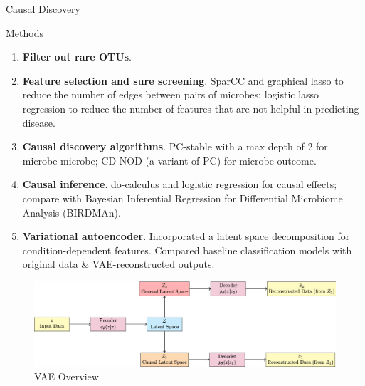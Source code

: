 \documentclass[final]{beamer}
\newlength{\colwidth}
\begin{document}
\begin{frame}[t]
\begin{columns}[t]
\begin{column}{\colwidth}
\begin{alertblock}{Causal Discovery}
	\end{alertblock}
	  
	  
\begin{block}{Methods}


    \begin{enumerate}
      \item \textbf{Filter out rare OTUs}. 
      \item \textbf{Feature selection and sure screening}. SparCC and graphical lasso to reduce the number of edges between pairs of microbes; logistic lasso regression to reduce the number of features that are not helpful in predicting disease. 
      \item \textbf{Causal discovery algorithms}. PC-stable with a max depth of 2 for microbe-microbe; CD-NOD (a variant of PC) for microbe-outcome.
      \item \textbf{Causal inference}. do-calculus and logistic regression for causal effects; compare with Bayesian Inferential Regression for Differential Microbiome Analysis (BIRDMAn).
      \item \textbf{Variational autoencoder}. Incorporated a latent space decomposition for condition-dependent features. Compared baseline classification models with original data \& VAE-reconstructed outputs.
    \end{enumerate}

    \begin{figure}[ht]
      \centering
      \includegraphics[width=\linewidth]{modified_vae.jpg} %
      \caption{VAE Overview}
      \label{fig:baseline_vae}
    \end{figure}

\end{block}


\end{column}
\end{columns}
\end{frame}
\end{document}
